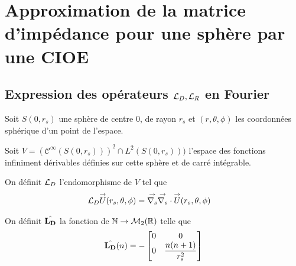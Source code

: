 \section{Approximation de la matrice d'impédance pour une sphère par une CIOE}

  \subsection[Expression des opérateurs LD,LR en Fourier]{Expression des opérateurs \({\mathcal{L}_D},{\mathcal{L}_R}\) en Fourier}


Soit \(S(0,r_s)\) une sphère de centre 0, de rayon \(r_s\) et \((r,\theta,\phi)\) les coordonnées sphérique d'un point de l'espace.

    Soit \(V = \left(\mathcal{C}^\infty(S(0,r_s))\right)^2 \cap L^2(S(0,r_s)))\) l'espace des fonctions infiniment dérivables définies sur cette sphère et de carré intégrable.

    \begin{defn}
      \label{eq:sphere:fourier:LD}
      On définit \({\mathcal{L}_D}\) l'endomorphisme de \(V\) tel que
      \begin{align*}
        {\mathcal{L}_D} {\overset{\rightarrow}{U}}(r_s,\theta,\phi) & = {\overset{\rightarrow}{\nabla_s}}{} {\overset{\rightarrow}{\nabla_s}} \cdot{} {\overset{\rightarrow}{U}}(r_s,\theta,\phi)
      \end{align*}

      On définit \(\hat{\mathbf{L_D}}\) la fonction de \(\mathbb N \rightarrow \mathcal{M}_2(\mathbb R)\) telle que
      \begin{equation*}
        \hat{\mathbf{L_D}}(n) = -
        \begin{bmatrix}
          0 & 0
          \\
          0 & \dfrac{n(n+1)}{r_s^2}
        \end{bmatrix}
      \end{equation*}
    \end{defn}

